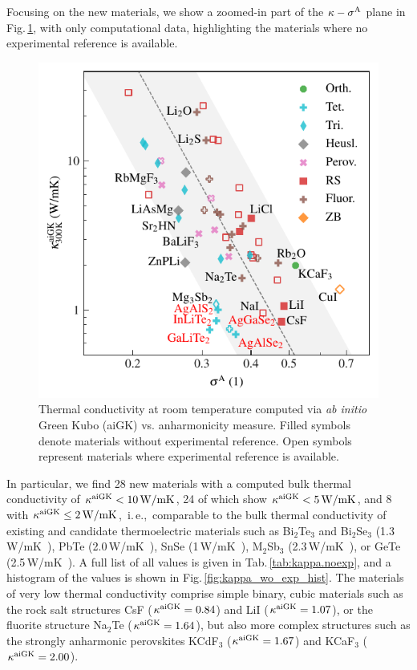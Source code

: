 Focusing on the new materials, we show a zoomed-in part of the $\kappa-\sigma^\mathrm{A}$ plane in Fig.\,\ref{fig:kappa_sigma}, with only computational data, highlighting the materials where no experimental reference is available.
%
\begin{figure}
	\includegraphics[width=\textwidth]{./data/plots/kappa_vs_sigma_trusted/kappa_vs_sigma_trusted_experiment.pdf}
	\caption{Thermal conductivity at room temperature computed via \emph{ab initio} Green Kubo (aiGK) vs. anharmonicity measure. Filled symbols denote materials without experimental reference. Open symbols represent materials where experimental reference is available.}
	\label{fig:kappa_sigma}
\end{figure}
%
In particular, we find 28 new materials with a computed bulk thermal conductivity of $\kappa^{\rm aiGK} < 10\,{\rm W/mK}$, 24 of which show $\kappa^{\rm aiGK} < 5\,{\rm W/mK}$, and 8 with $\kappa^{\rm aiGK} \leq 2\,{\rm W/mK}$,~i.\,e.,~comparable to the bulk thermal conductivity of existing and candidate thermoelectric materials such as Bi$_2$Te$_3$ and Bi$_2$Se$_3$ (1.3\,W/mK~\cite{Goldsmid1956,Satterthwaite1957}), PbTe (2.0\,W/mK~\cite{ElSharkawy1983}), SnSe (1\,W/mK~\cite{zhao2014,wei2016,sassi2014}), M$_2$Sb$_3$ (2.3\,W/mK~\cite{ahmadpour2007,pan2020}), or GeTe (2.5\,W/mK~\cite{Perumal2015}). A full list of all values is given in Tab.\,\ref{tab:kappa.noexp}, and a histogram of the values is shown in Fig.\,\ref{fig:kappa_wo_exp_hist}. The materials of very low thermal conductivity comprise simple binary, cubic materials such as the rock salt structures CsF ($\kappa^{\rm aiGK} = 0.84$) and LiI ($\kappa^{\rm aiGK} = 1.07$), or the fluorite structure Na$_2$Te ($\kappa^{\rm aiGK} = 1.64$), but also more complex structures such as the strongly anharmonic perovskites KCdF$_3$ ($\kappa^{\rm aiGK} = 1.67$) and KCaF$_3$ ($\kappa^{\rm aiGK} = 2.00$).


